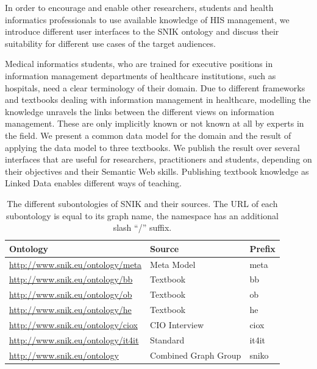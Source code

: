 \documentclass[conference]{IEEEtran}
\begin{document}
In order to encourage and enable other researchers, students and health informatics professionals to use available knowledge of HIS management, we introduce different user interfaces to the SNIK ontology and discuss their suitability for different use cases of the target audiences.

Medical informatics students, who are trained for executive positions in information management departments of healthcare institutions, such as hospitals, need a clear terminology of their domain.
Due to different frameworks and textbooks dealing with information management in healthcare, modelling the knowledge unravels the links between the different views on information management.
These are only implicitly known or not known at all by experts in the field.
%
We present a common data model for the domain and the result of applying the data model to three textbooks.
We publish the result over several interfaces that are useful for researchers, practitioners and students, depending on their objectives and their Semantic Web skills.
%
Publishing textbook knowledge as Linked Data enables different ways of teaching.

\begin{table}[t!]
\caption{The different subontologies of SNIK and their sources.
The URL of each subontology is equal to its graph name, the namespace has an additional slash \enquote{/} suffix.
}
\label{tab:source}
\begin{center}
\begin{tabular}{lll}
\toprule
\textbf{Ontology}				&\textbf{Source}					&\textbf{Prefix}\\
\midrule
\url{http://www.snik.eu/ontology/meta}		&Meta Model				&meta\\
\url{http://www.snik.eu/ontology/bb}		&Textbook~\cite{bb}		&bb\\
\url{http://www.snik.eu/ontology/ob}		&Textbook~\cite{ob}		&ob\\
\url{http://www.snik.eu/ontology/he}		&Textbook~\cite{he}		&he\\
\url{http://www.snik.eu/ontology/ciox}		&CIO Interview			&ciox\\
\url{http://www.snik.eu/ontology/it4it}		&Standard~\cite{it4it}	&it4it\\
\url{http://www.snik.eu/ontology}			&Combined Graph Group	&sniko\\
\bottomrule
\end{tabular}
\end{center}
\end{table}
\end{document}
